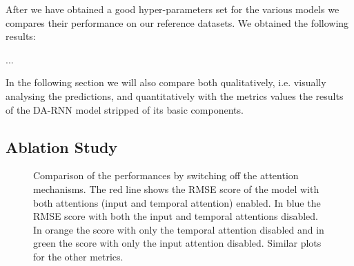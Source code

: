 \documentclass{article}
\begin{document}
After we have obtained a good hyper-parameters set for the various models we 
compares their performance on our reference datasets. We obtained the following 
results:

...

In the following section we will also compare both qualitatively, i.e. visually 
analysing the predictions, and quantitatively with the metrics values the results 
of the DA-RNN model stripped of its basic components.


\subsection{Ablation Study}


\begin{figure}[h]
  \centering
  \caption{Comparison of the performances by switching off the attention
  mechanisms. The red line shows the RMSE score of the model with both
  attentions (input and temporal attention) enabled. In blue the RMSE score
  with both the input and temporal attentions disabled. In orange the score
  with only the temporal attention disabled and in green the score with
  only the input attention disabled. Similar plots for the other metrics.}
\end{figure}
\end{document}
